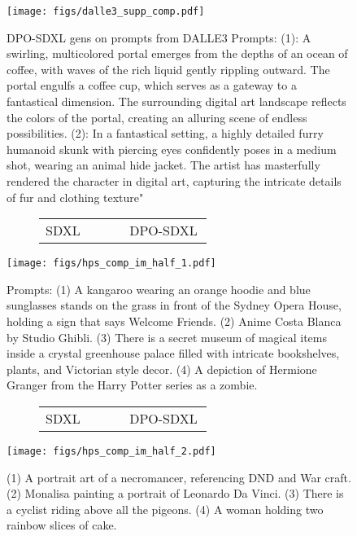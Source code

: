 \documentclass[10pt,twocolumn,letterpaper]{article}
\begin{document}
\begin{figure}[t]
\centering
   \texttt{[image: figs/dalle3\_supp\_comp.pdf]}
\caption{
   DPO-SDXL gens on prompts from DALLE3 \cite{dalle3}
   Prompts:
   (1): A swirling, multicolored portal emerges from the depths of an ocean of coffee, with waves of the rich liquid gently rippling outward. The portal engulfs a coffee cup, which serves as a gateway to a fantastical dimension. The surrounding digital art landscape reflects the colors of the portal, creating an alluring scene of endless possibilities.
   (2): In a fantastical setting, a highly detailed furry humanoid skunk with piercing eyes confidently poses in a medium shot, wearing an animal hide jacket. The artist has masterfully rendered the character in digital art, capturing the intricate details of fur and clothing texture"
   }
   \label{fig:dalle3}
\end{figure}



\begin{figure}[t]
  \centering
  
   \begin{subfigure}{\linewidth}
            \centering
            \begin{tabular}{ >{\centering}p{0.3\linewidth} >{\centering}p{0.3\linewidth} }
SDXL & DPO-SDXL\end{tabular}
    \end{subfigure}
   \texttt{[image: figs/hps\_comp\_im\_half\_1.pdf]}
\caption{
   Prompts:
   (1) A kangaroo wearing an orange hoodie and blue sunglasses stands on the grass in front of the Sydney Opera House, holding a sign that says Welcome Friends.
    (2) Anime Costa Blanca by Studio Ghibli.
    (3) There is a secret museum of magical items inside a crystal greenhouse palace filled with intricate bookshelves, plants, and Victorian style decor.
    (4) A depiction of Hermione Granger from the Harry Potter series as a zombie.
   }
   \label{fig:hps_comp_supp1}
\end{figure}


\begin{figure}[t]
  \centering
   \begin{subfigure}{\linewidth}
            \centering
            \begin{tabular}{ >{\centering}p{0.3\linewidth} >{\centering}p{0.3\linewidth} }
SDXL & DPO-SDXL\end{tabular}
    \end{subfigure}
   \texttt{[image: figs/hps\_comp\_im\_half\_2.pdf]}
\caption{
    (1) A portrait art of a necromancer, referencing DND and War craft.
    (2) Monalisa painting a portrait of Leonardo Da Vinci.
    (3) There is a cyclist riding above all the pigeons.
    (4) A woman holding two rainbow slices of cake.
   }
   \label{fig:hps_comp_supp2}
\end{figure}

 
\end{document}
